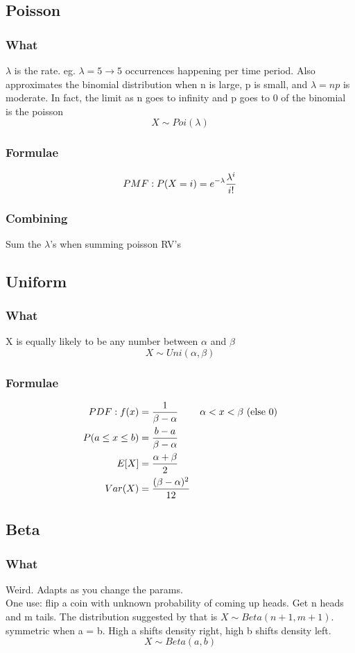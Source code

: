 \documentclass[12pt]{amsart}
\begin{document}
\subsection{Poisson}
\subsubsection{What}
$\lambda$ is the rate. eg. $\lambda = 5 \to 5$ occurrences happening per time period. Also approximates the binomial distribution when n is large, p is small, and $\lambda = np$ is moderate. In fact, the limit as n goes to infinity and p goes to 0 of the binomial is the poisson
\[
X \sim Poi(\lambda)
\]
\subsubsection{Formulae}
\begin{align*}
PMF: P(X=i) = e^{-\lambda} {\lambda^i \over i!}
\end{align*}
\subsubsection{Combining}
Sum the $\lambda$'s when summing poisson RV's
%
\subsection{Uniform}
\subsubsection{What}
X is equally likely to be any number between $\alpha$ and $\beta$
\[
X \sim Uni(\alpha, \beta)
\]
\subsubsection{Formulae}
\begin{align*}
PDF: f(x) &= {1 \over \beta - \alpha} & \alpha < x < \beta \text{ (else 0)} \\
P(a \leq x \leq b) &= {b - a \over \beta - \alpha} \\
E[X] &= {\alpha + \beta \over 2} \\
Var(X) &= {(\beta - \alpha)^2 \over 12}
\end{align*}
%
\subsection{Beta}
\subsubsection{What}
Weird. Adapts as you change the params.\\
One use: flip a coin with unknown probability of coming up heads. Get n heads and m tails. The distribution suggested by that is $X \sim Beta(n + 1, m + 1)$. \\
symmetric when a = b.  High a shifts density right, high b shifts density left.
\[
X \sim Beta(a,b)
\]
\end{document}
